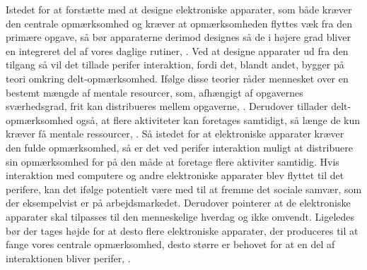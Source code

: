 Istedet for at forstætte med at designe elektroniske apparater, som både kræver den centrale opmærksomhed og kræver at opmærksomheden flyttes væk fra den primære opgave, så bør apparaterne derimod designes så de i højere grad bliver en integreret del af vores daglige rutiner, \parencite[s. 239]{PDF:PICharacteristicsAndConsiderations}. Ved at designe apparater ud fra den tilgang så vil det tillade perifer interaktion, fordi det, blandt andet, bygger på teori omkring delt-opmærksomhed. Ifølge disse teorier råder mennesket over en bestemt mængde af mentale resourcer, som, afhængigt af opgavernes sværhedsgrad, frit kan distribueres mellem opgaverne, \parencite[s. 240]{PDF:PICharacteristicsAndConsiderations}. Derudover tillader delt-opmærksomhed også, at flere aktiviteter kan foretages samtidigt, så længe de kun kræver få mentale ressourcer, \parencite[s. 2]{PDF:FacilitatingPIDesignAndEvaluation}. Så istedet for at elektroniske apparater kræver den fulde opmærksomhed, så er det ved perifer interaktion muligt at distribuere sin opmærksomhed for på den måde at foretage flere aktiviter samtidig. Hvis interaktion med computere og andre elektroniske apparater blev flyttet til det perifere, kan det ifølge \textcite[s. 11]{PDF:TheComputerWeiser} potentielt være med til at fremme det sociale samvær, som der eksempelvist er på arbejdsmarkedet. Derudover pointerer \textcite[s. 11]{PDF:TheComputerWeiser} at de elektroniske apparater skal tilpasses til den menneskelige hverdag og ikke omvendt. Ligeledes bør der tages højde for at desto flere elektroniske apparater, der produceres til at fange vores centrale opmærksomhed, desto større er behovet for at en del af interaktionen bliver perifer, \parencite[s. 240]{PDF:PICharacteristicsAndConsiderations}.
%
